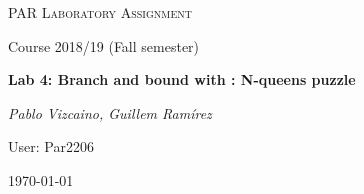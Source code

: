 \makeatletter
\begin{titlepage}
\thispagestyle{empty}
\begin{center}
	\centering
	\vspace{1cm}
	{\scshape\Large PAR Laboratory Assignment\par}
	\vspace{0.75cm}
	{\Large Course 2018/19 (Fall semester)\par}
	\vspace{0.75cm}
	{\huge\bfseries Lab 4: Branch and bound with \omp: N-queens puzzle\par}
	\vspace{1cm}
	{\Large\itshape Pablo Vizcaino, Guillem Ramírez\par}
    \vspace{0.5cm}
    {\Large User: Par2206\par}
    \vfill
	{\large \today\par}
\end{center}
\clearpage
\end{titlepage}
